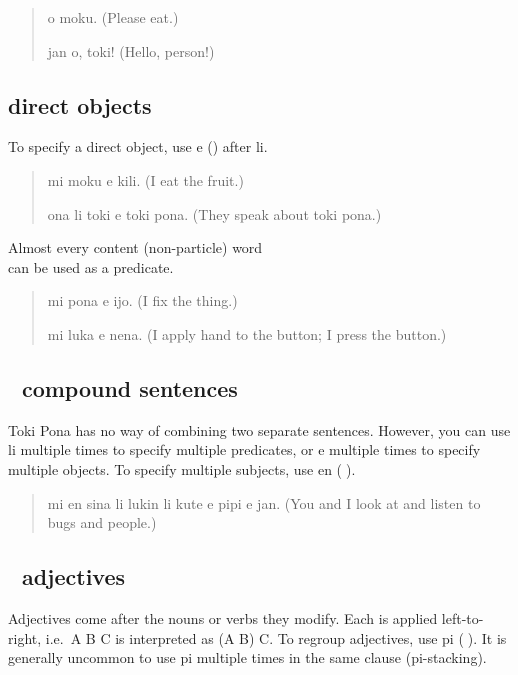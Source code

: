 \documentclass[statementpaper,oneside,article,14pt]{memoir}
\begin{document}
\begin{quote}
  o moku. (Please eat.)

  jan o, toki! (Hello, person!)
\end{quote}

\subsection{{} direct objects}

\noindent To specify a direct object, use e ({}) after li.

\begin{quote}
  mi moku e kili. (I eat the fruit.)

  ona li toki e toki pona. (They speak about toki pona.)
\end{quote}

\noindent Almost every content (non-particle) word \\ can be used as a predicate.

\begin{quote}
  mi pona e ijo. (I fix the thing.)

  mi luka e nena. (I apply hand to the button; I press the button.)
\end{quote}

\subsection{{\sitpon󱤊} compound sentences}

\noindent Toki Pona has no way of combining two separate sentences. However, you can use li multiple times 
to specify multiple predicates, or e multiple times to specify multiple objects. To specify 
multiple subjects, use en ({\sitpon󱤊}).

\begin{quote}
  mi en sina li lukin li kute e pipi e jan. (You and I look at and listen to bugs and people.)
\end{quote}


\subsection{{\sitpon󱥍} adjectives}

\noindent Adjectives come after the nouns or verbs they modify. Each is applied left-to-right, i.e.\ A B C is interpreted as (A B) C. To regroup adjectives, use pi ({\sitpon󱥍}). It is generally uncommon to use pi multiple times in the same clause (pi-stacking).
\end{document}
